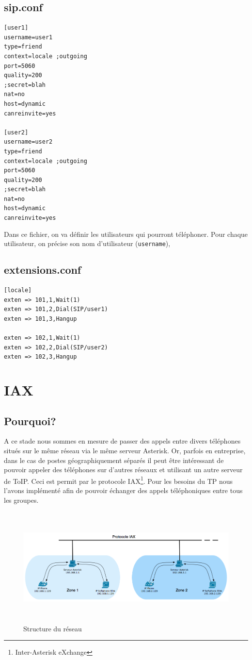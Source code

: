 \documentclass[12pt,a4paper,notitlepage]{article}
\begin{document}
\subsection{sip.conf}

\begin{lstlisting}[title=sip.conf v1]
[user1]
username=user1
type=friend
context=locale ;outgoing
port=5060
quality=200
;secret=blah
nat=no
host=dynamic
canreinvite=yes

[user2]
username=user2
type=friend
context=locale ;outgoing
port=5060
quality=200
;secret=blah
nat=no
host=dynamic
canreinvite=yes
\end{lstlisting}
Dans ce fichier, on va définir les utilisateurs qui pourront téléphoner. Pour chaque utilisateur, on précise son nom d'utilisateur (\texttt{username}), 


\subsection{extensions.conf}

\begin{lstlisting}[title=Extensions.conf v1]
[locale]
exten => 101,1,Wait(1)
exten => 101,2,Dial(SIP/user1)
exten => 101,3,Hangup

exten => 102,1,Wait(1)
exten => 102,2,Dial(SIP/user2)
exten => 102,3,Hangup
\end{lstlisting}

\clearpage
\section{IAX} 
\subsection{Pourquoi?}
A ce stade nous sommes en mesure de passer des appels entre divers téléphones situés sur le même réseau via le même serveur Asterisk. Or, parfois en entreprise, dans le cas de postes géographiquement séparés il peut être intéressant de pouvoir appeler des téléphones sur d'autres réseaux et utilisant un autre serveur de ToIP. Ceci est permit par le protocole IAX\footnote{Inter-Asterisk eXchange}. Pour les besoins du TP nous l'avons implémenté afin de pouvoir échanger des appels téléphoniques entre tous les groupes.

\begin{figure}[!h]
\begin{center}
\includegraphics[height=6cm]{structure_reseau_IAX}
\caption{Structure du réseau}
\label{fig:da}
\end{center}
\end{figure}
\end{document}
